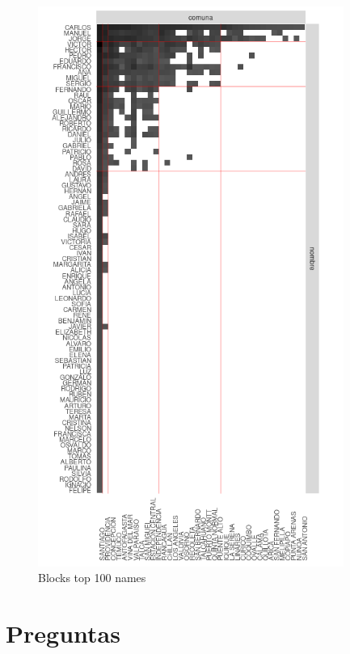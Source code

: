 \begin{enumerate}
\begin{figure}[H]
    \centering
    \includegraphics[width=10cm]{plot/blocks.png}
    \caption{Blocks top 100 names}
    \label{}
\end{figure}

\end{enumerate}

\section{Preguntas}

